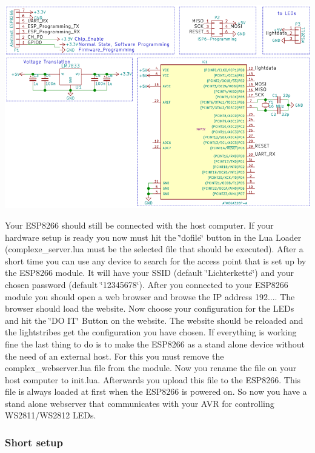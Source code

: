 \begin{DoxyImage}
\includegraphics[width=\textwidth,height=\textheight/2,keepaspectratio=true]{Ws2811_Atmega328.png}
\caption{schematic using E\+S\+P8266 with A\+V\+R W\+S2811 software}
\end{DoxyImage}
 Your E\+S\+P8266 should still be connected with the host computer. If your hardware setup is ready you now must hit the \char`\"{}dofile\char`\"{} button in the Lua Loader (complexe\+\_\+server.\+lua must be the selected file that should be executed). After a short time you can use any device to search for the access point that is set up by the E\+S\+P8266 module. It will have your S\+S\+I\+D (default \char`\"{}\+Lichterkette\char`\"{}) and your chosen password (default \char`\"{}12345678\char`\"{}). After you connected to your E\+S\+P8266 module you should open a web browser and browse the I\+P address 192.... The browser should load the website. Now choose your configuration for the L\+E\+Ds and hit the \char`\"{}\+D\+O I\+T\char`\"{} Button on the website. The website should be reloaded and the lightstribes get the configuration you have chosen. If everything is working fine the last thing to do is to make the E\+S\+P8266 as a stand alone device without the need of an external host. For this you must remove the complex\+\_\+webserver.\+lua file from the module. Now you rename the file on your host computer to init.\+lua. Afterwards you upload this file to the E\+S\+P8266. This file is always loaded at first when the E\+S\+P8266 is powered on. So now you have a stand alone webserver that communicates with your A\+V\+R for controlling W\+S2811/\+W\+S2812 L\+E\+Ds.~\newline
\hypertarget{index_short_setup}{}\subsubsection{Short setup}\label{index_short_setup}

